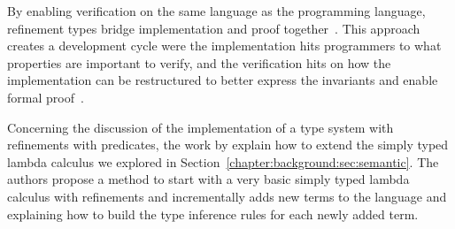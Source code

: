 \documentclass[
  oneside,
  english,
  coorientadorbanca,
  noabntexcite
]{ufsc-thesis-rn46-2019}
\begin{document}
By enabling verification on the same language as the programming language, refinement types bridge implementation and proof together~\cite{jhala2020tutorial}.
This approach creates a development cycle were the implementation hits programmers to what properties are important to verify, and the verification hits on how the implementation can be restructured to better express the invariants and enable formal proof~\cite{jhala2020tutorial}.

Concerning the discussion of the implementation of a type system with refinements with predicates, the work by \textcite{jhala2020tutorial} explain how to extend the simply typed lambda calculus we explored in Section~\ref{chapter:background:sec:semantic}.
The authors propose a method to start with a very basic simply typed lambda calculus with refinements and incrementally adds new terms to the language and explaining how to build the type inference rules for each newly added term.
\end{document}
